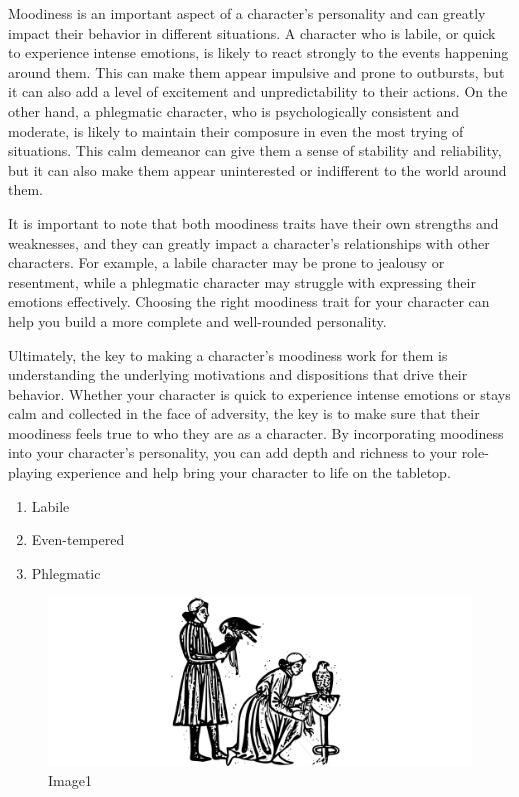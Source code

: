 Moodiness is an important aspect of a character's personality and can
greatly impact their behavior in different situations. A character who
is labile, or quick to experience intense emotions, is likely to react
strongly to the events happening around them. This can make them appear
impulsive and prone to outbursts, but it can also add a level of
excitement and unpredictability to their actions. On the other hand, a
phlegmatic character, who is psychologically consistent and moderate, is
likely to maintain their composure in even the most trying of
situations. This calm demeanor can give them a sense of stability and
reliability, but it can also make them appear uninterested or
indifferent to the world around them.

It is important to note that both moodiness traits have their own
strengths and weaknesses, and they can greatly impact a character's
relationships with other characters. For example, a labile character may
be prone to jealousy or resentment, while a phlegmatic character may
struggle with expressing their emotions effectively. Choosing the right
moodiness trait for your character can help you build a more complete
and well-rounded personality.

Ultimately, the key to making a character's moodiness work for them is
understanding the underlying motivations and dispositions that drive
their behavior. Whether your character is quick to experience intense
emotions or stays calm and collected in the face of adversity, the key
is to make sure that their moodiness feels true to who they are as a
character. By incorporating moodiness into your character's personality,
you can add depth and richness to your role-playing experience and help
bring your character to life on the tabletop.

\begin{enumerate}
\def\labelenumi{\arabic{enumi}.}
\tightlist
\item
  Labile
\item
  Even-tempered
\item
  Phlegmatic
\end{enumerate}

\begin{figure}
\centering
\includegraphics{./images/personality03.pdf}
\caption{Image1}
\end{figure}

